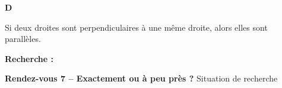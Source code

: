\documentclass[10pt,a4paper]{article}
\newcommand{\titreRDV}[2]{%
{\sffamily\LARGE\bfseries\color{TitreC}#1}
\hfill
{\sffamily\small #2}

\vspace{0.16cm}
}
\begin{document}
{\begin{minipage}[t]{0.48\linewidth}
\vspace{0.2cm}

\begin{tcolorbox}[
  colback=white,
  colframe=NeutreC!45,
  boxrule=0.5pt,
  height=5.3cm
]
\textbf{D}

\vspace{0.3cm}

Si deux droites sont perpendiculaires
à une même droite,
alors elles sont parallèles.

\vfill

\textbf{Recherche :}
\end{tcolorbox}

\end{minipage}

%
%
%
%
%
%
%
%
%
%
}

\newpage


\titreRDV
{Rendez-vous 7 -- Exactement ou à peu près ?}
{Situation de recherche}
\end{document}
